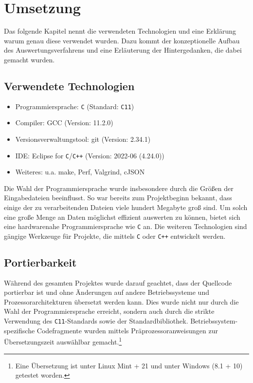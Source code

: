 \documentclass[a4paper,10pt]{article}
\begin{document}
\section{Umsetzung}
    Das folgende Kapitel nennt die verwendeten Technologien und eine Erklärung warum genau diese verwendet wurden. Dazu kommt der konzeptionelle Aufbau des Auswertungsverfahrens und eine Erläuterung der Hintergedanken, die dabei gemacht wurden.

    \subsection{Verwendete Technologien}
        \begin{itemize}
            \item Programmiersprache: \texttt{C} (Standard: \texttt{C11})
            \item Compiler: GCC (Version: 11.2.0)
            \item Versionsverwaltungstool: git (Version: 2.34.1)
            \item IDE: Eclipse for \texttt{C}/\texttt{C++} (Version: 2022-06 (4.24.0))
            \item Weiteres: u.a. make, Perf, Valgrind, cJSON
        \end{itemize}
        Die Wahl der Programmiersprache wurde insbesondere durch die Größen der Eingabedateien beeinflusst. So war bereits zum Projektbeginn bekannt, dass einige der zu verarbeitenden Dateien viele hundert Megabyte groß sind. Um solch eine große Menge an Daten möglichst effizient auswerten zu können, bietet sich eine hardwarenahe Programmiersprache wie \texttt{C} an. Die weiteren Technologien sind gängige Werkzeuge für Projekte, die mittels \texttt{C} oder \texttt{C++} entwickelt werden.

    \subsection{Portierbarkeit}
        Während des gesamten Projektes wurde darauf geachtet, dass der Quellcode portierbar ist und ohne Änderungen auf andere Betriebssysteme und Prozessorarchitekturen übersetzt werden kann. Dies wurde nicht nur durch die Wahl der Programmiersprache erreicht, sondern auch durch die strikte Verwendung des \texttt{C11}-Standards sowie der Standardbibliothek. Betriebssystem-spezifische Codefragmente wurden mittels Präprozessoranweisungen zur Übersetzungszeit auswählbar gemacht.\footnote{Eine Übersetzung ist unter Linux Mint + 21 und unter Windows (8.1 + 10) getestet worden.}
\end{document}
